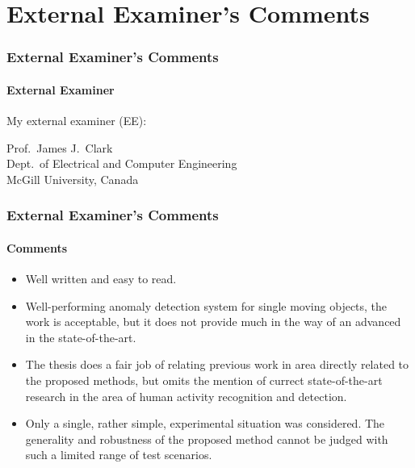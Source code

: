 
\section{External Examiner's Comments}

\begin{frame}
    \frametitle{External Examiner's Comments}
    \framesubtitle{External Examiner}

    My external examiner (EE):

    \medskip

    Prof.\ James J.\ Clark \\
    Dept.\ of Electrical and Computer Engineering \\
    McGill University, Canada

\end{frame}


\begin{frame}
    \frametitle{External Examiner's Comments}
    \framesubtitle{Comments}

    \begin{itemize}
        \item Well written and easy to read.
        \item Well-performing anomaly detection system for single 
            moving objects, the work is acceptable, but it does not 
            provide much in the way of an advanced in the state-of-the-art. 
        \item The thesis does a fair job of relating previous work in area 
            directly related to the proposed methods, but omits the mention 
            of currect state-of-the-art research in the area of human 
            activity recognition and detection.
        \item Only a single, rather simple, experimental situation was 
            considered. The generality and robustness of the proposed 
            method cannot be judged with such a limited range of test 
            scenarios. 
    \end{itemize}

\end{frame}


